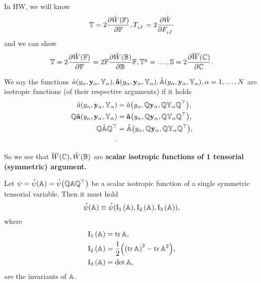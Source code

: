\documentclass[reqno, a4paper]{article}
\begin{document}
In HW, we will know
\[
	\pkstress = 2 \pdv{\hat{W}\qty(\fgrad)}{\fgrad}, T \indices{_{iJ}} = 2 \pdv{\hat{W}}{F \indices{_{iJ}}}
\]
and we can show
\[
	\mathbb{T} = 2\pdv{\hat{W}\qty(\ensuremath{\mathbb{F}})}{\ensuremath{\mathbb{F}}} = 2 \mathbb{F} \pdv{\tilde{W}\qty(\ensuremath{\mathbb{B}})}{\ensuremath{\mathbb{B}}}\mathbb{F}, \mathbb{T}^y  = \dots, \mathbb{S} = 2 \pdv{\overline{W}\qty(\ensuremath{\mathbb{C}})}{\ensuremath{\mathbb{C}}}.
\]

\begin{definition}
	We say the functions $\hat{a}\qty(y_{\alpha}, \vb{y}_{\alpha}, \mathbb{Y}_{\alpha}), \vb{\hat{a}}\qty(y_{\alpha}, \vb{y}_{\alpha}, \mathbb{Y}_{\alpha}), \hat{\mathbb{A}}\qty(y_{\alpha},\vb{y}_{\alpha},\mathbb{Y}_{\alpha}), \alpha = 1, \dots, N$ are isotropic functions (of their respective arguments) if it holds
	\begin{align*}
		\hat{a}\qty(y_{\alpha}, \vb{y}_{\alpha}, \mathbb{Y}_{\alpha}) &= \hat{a}\qty(y_{\alpha}, \mathbb{Q}\vb{y}_{\alpha}, \mathbb{Q} \mathbb{Y}_{\alpha} \mathbb{Q}^\top), \\
		\mathbb{Q} \vb{\hat{a}}\qty(y_{\alpha}, \vb{y}_{\alpha}, \mathbb{Y}_{\alpha}) &= \vb{\hat{a}}\qty(y_{\alpha}, \mathbb{Q}\vb{y}_{\alpha}, \mathbb{Q}\mathbb{Y}_{\alpha}\mathbb{Q}^\top), \\
		\mathbb{Q}\hat{\mathbb{A}} \mathbb{Q}^\top &= \hat{\mathbb{A}}\qty(y_{\alpha}, \mathbb{Q}\vb{y}_{\alpha}, \mathbb{Q}\mathbb{Y}_{\alpha}\mathbb{Q}^\top), \\.
	\end{align*}
\end{definition}
So we see that $\overline{W}\qty(\mathbb{C}), \tilde{W}\qty(\mathbb{B})$ are \textbf{scalar isotropic functions of 1 tensorial (symmetric) argument.}

\begin{theorem}
	Let $\psi = \hat{\psi}\qty(\mathbb{A}) = \hat{\psi}\qty(\mathbb{Q}\mathbb{A}\mathbb{Q}^\top)$ be a scalar isotropic function of a single symmetric tensorial variable. Then it must hold
	\[
		\hat{\psi}\qty(\mathbb{A}) \equiv \hat{\psi}\qty(\operatorname{I_1}\qty(\mathbb{A}),\operatorname{I_2}\qty(\mathbb{A}),\operatorname{I_3}\qty(\mathbb{A})),
	\]	
where
\begin{align*}
	\operatorname{I_1}\qty(\mathbb{A}) &= \tr \mathbb{A},\\
	\operatorname{I_2}\qty(\mathbb{A}) &= \frac{1}{2}\qty(\qty(\tr \mathbb{A})^{2}-\tr \mathbb{A}^{2}),\\
	\operatorname{I_3}\qty(\mathbb{A}) &= \det \mathbb{A},
\end{align*}
are the invariants of $\mathbb{A}$.
\end{theorem}
\end{document}
